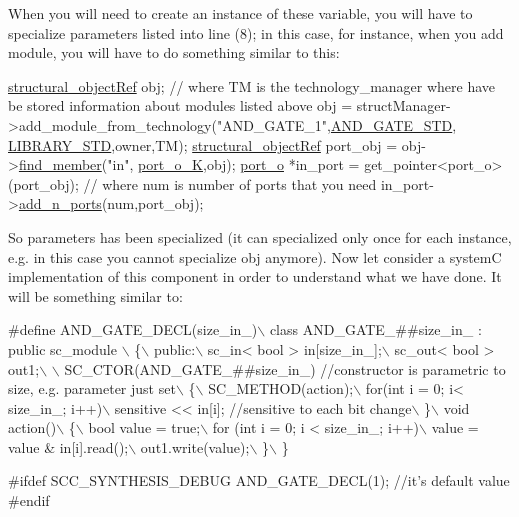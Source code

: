 When you will need to create an instance of these variable, you will have to specialize parameters listed into line (8); in this case, for instance, when you add module, you will have to do something similar to this\+: 
\begin{DoxyCode}
\hyperlink{structrefcount}{structural\_objectRef} obj;
\textcolor{comment}{// where TM is the technology\_manager where have be stored information about modules listed above}
obj = structManager->add\_module\_from\_technology(\textcolor{stringliteral}{"AND\_GATE\_1"},\hyperlink{technology__node_8hpp_a92082a6ad93e10690c4c96dac3496de8}{AND\_GATE\_STD},
      \hyperlink{technology__manager_8hpp_a0033bdd1d1c034f88d486516cd90f614}{LIBRARY\_STD},owner,TM);
\hyperlink{structrefcount}{structural\_objectRef} port\_obj = obj->\hyperlink{classstructural__object_a3a8b2d38c2b5666700053a72868bb6b2}{find\_member}(\textcolor{stringliteral}{"in"},
      \hyperlink{structural__objects_8hpp_acf52399aecacb7952e414c5746ce6439acdcc7e8708a89b5424ed8b41c47f19b0}{port\_o\_K},obj);
\hyperlink{structport__o}{port\_o} *in\_port = get\_pointer<port\_o>(port\_obj);
\textcolor{comment}{// where num is number of ports that you need}
in\_port->\hyperlink{structport__o_adf5180258c79071f73582bf9427a8f06}{add\_n\_ports}(num,port\_obj);
\end{DoxyCode}
 So parameters has been specialized (it can specialized only once for each instance, e.\+g. in this case you cannot specialize obj anymore). Now let consider a systemC implementation of this component in order to understand what we have done. It will be something similar to\+: 
\begin{DoxyCode}
\textcolor{preprocessor}{#define AND\_GATE\_DECL(size\_in\_)\(\backslash\)}
\textcolor{preprocessor}{class AND\_GATE\_##size\_in\_ : public sc\_module \(\backslash\)}
\textcolor{preprocessor}{\{\(\backslash\)}
\textcolor{preprocessor}{public:\(\backslash\)}
\textcolor{preprocessor}{  sc\_in< bool > in[size\_in\_];\(\backslash\)}
\textcolor{preprocessor}{  sc\_out< bool > out1;\(\backslash\)}
\textcolor{preprocessor}{\(\backslash\)}
\textcolor{preprocessor}{  SC\_CTOR(AND\_GATE\_##size\_in\_)    //constructor is parametric to size, e.g. parameter just set\(\backslash\)}
\textcolor{preprocessor}{  \{\(\backslash\)}
\textcolor{preprocessor}{    SC\_METHOD(action);\(\backslash\)}
\textcolor{preprocessor}{    for(int i = 0; i< size\_in\_; i++)\(\backslash\)}
\textcolor{preprocessor}{      sensitive << in[i];            //sensitive to each bit change\(\backslash\)}
\textcolor{preprocessor}{  \}\(\backslash\)}
\textcolor{preprocessor}{  void action()\(\backslash\)}
\textcolor{preprocessor}{  \{\(\backslash\)}
\textcolor{preprocessor}{    bool value = true;\(\backslash\)}
\textcolor{preprocessor}{    for (int i = 0; i < size\_in\_; i++)\(\backslash\)}
\textcolor{preprocessor}{        value = value & in[i].read();\(\backslash\)}
\textcolor{preprocessor}{    out1.write(value);\(\backslash\)}
\textcolor{preprocessor}{  \}\(\backslash\)}
\textcolor{preprocessor}{\}}

\textcolor{preprocessor}{#ifdef SCC\_SYNTHESIS\_DEBUG}
AND\_GATE\_DECL(1);                     \textcolor{comment}{//it's default value}
\textcolor{preprocessor}{#endif}
\end{DoxyCode}
